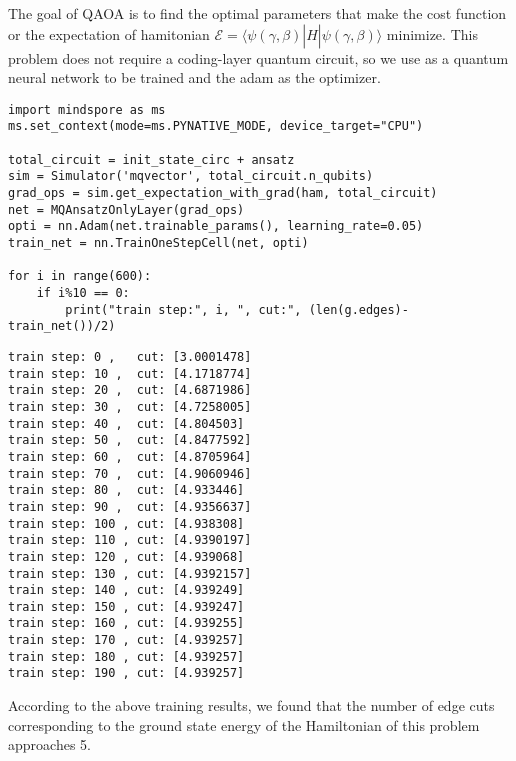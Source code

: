 The goal of QAOA is to find the optimal parameters that make the cost function or the expectation of hamitonian $\mathcal{E}=\langle \psi(\gamma, \beta)|\hat{H}|\psi(\gamma, \beta)\rangle$ minimize.
This problem does not require a coding-layer quantum circuit, so we use \MQAnsatzOnlyLayer as a quantum neural network to be trained and the adam as the optimizer.
\begin{lstlisting}
import mindspore as ms
ms.set_context(mode=ms.PYNATIVE_MODE, device_target="CPU")

total_circuit = init_state_circ + ansatz
sim = Simulator('mqvector', total_circuit.n_qubits)
grad_ops = sim.get_expectation_with_grad(ham, total_circuit)
net = MQAnsatzOnlyLayer(grad_ops)
opti = nn.Adam(net.trainable_params(), learning_rate=0.05)
train_net = nn.TrainOneStepCell(net, opti)

for i in range(600):
    if i%10 == 0:
        print("train step:", i, ", cut:", (len(g.edges)-train_net())/2)
\end{lstlisting}
\begin{lstlisting}
train step: 0 ,   cut: [3.0001478]
train step: 10 ,  cut: [4.1718774]
train step: 20 ,  cut: [4.6871986]
train step: 30 ,  cut: [4.7258005]
train step: 40 ,  cut: [4.804503]
train step: 50 ,  cut: [4.8477592]
train step: 60 ,  cut: [4.8705964]
train step: 70 ,  cut: [4.9060946]
train step: 80 ,  cut: [4.933446]
train step: 90 ,  cut: [4.9356637]
train step: 100 , cut: [4.938308]
train step: 110 , cut: [4.9390197]
train step: 120 , cut: [4.939068]
train step: 130 , cut: [4.9392157]
train step: 140 , cut: [4.939249]
train step: 150 , cut: [4.939247]
train step: 160 , cut: [4.939255]
train step: 170 , cut: [4.939257]
train step: 180 , cut: [4.939257]
train step: 190 , cut: [4.939257]
\end{lstlisting}

According to the above training results, we found that the number of edge cuts corresponding to the ground state energy of the Hamiltonian of this problem approaches 5.


